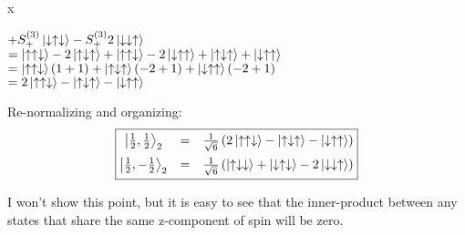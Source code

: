 x\documentclass[12pt]{article}
\begin{document}
\begin{enumerate}[label=\alph*)]
\hspace*{5.7em}$+ S_+^{(3)}\ket{\downarrow\uparrow\downarrow} - S_+^{(3)}2\ket{\downarrow\downarrow\uparrow}$\vspace{0.5em}\\
\hspace*{2.7em}$= \ket{\uparrow\uparrow\downarrow}-2\ket{\uparrow\downarrow\uparrow}+\ket{\uparrow\uparrow\downarrow}-2\ket{\downarrow\uparrow\uparrow}+\ket{\uparrow\downarrow\uparrow}+\ket{\downarrow\uparrow\uparrow}$\vspace{0.5em}\\
\hspace*{2.7em}$=\ket{\uparrow\uparrow\downarrow}(1+1) + \ket{\uparrow\downarrow\uparrow}(-2+1) + \ket{\downarrow\uparrow\uparrow}(-2+1)$\vspace{0.5em}\\
\hspace*{2.7em}$=2\ket{\uparrow\uparrow\downarrow}-\ket{\uparrow\downarrow\uparrow}-\ket{\downarrow\uparrow\uparrow}$

Re-normalizing and organizing:
\[\boxed{\mqty{\ket{\frac{1}{2}, \frac{1}{2}}_2	& = & \frac{1}{\sqrt{6}}\left(2\ket{\uparrow\uparrow\downarrow}-\ket{\uparrow\downarrow\uparrow} - \ket{\downarrow\uparrow\uparrow}\right)\vspace{0.5em}\\ \ket{\frac{1}{2}, -\frac{1}{2}}_2 & = & \frac{1}{\sqrt{6}}\left(\ket{\uparrow\downarrow\downarrow}+\ket{\downarrow\uparrow\downarrow}-2\ket{\downarrow\downarrow\uparrow}\right)}}\]

I won't show this point, but it is easy to see that the inner-product between any states that share the same z-component of spin will be zero. 

\end{enumerate}

\newpage
\end{document}
